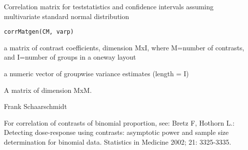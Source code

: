 \begin{Description}\relax
Correlation matrix for teststatistics and confidence intervals assuming multivariate standard normal distribution
\end{Description}
\begin{Usage}
\begin{verbatim}
corrMatgen(CM, varp)
\end{verbatim}
\end{Usage}
\begin{Arguments}
\begin{ldescription}
\item[\code{CM}] a matrix of contrast coefficients, dimension MxI, where M=number of contrasts, and I=number of groups in a oneway layout 
\item[\code{varp}] a numeric vector of groupwise variance estimates (length = I) 
\end{ldescription}
\end{Arguments}
\begin{Details}\relax
\end{Details}
\begin{Value}
A matrix of dimension MxM.
\end{Value}
\begin{Author}\relax
Frank Schaarschmidt
\end{Author}
\begin{References}\relax
For correlation of contrasts of binomial proportion, see:
Bretz F, Hothorn L.:
Detecting dose-response using contrasts: asymptotic power and sample size determination for binomial data.
Statistics in Medicine 2002; 21: 3325-3335.
\end{References}

